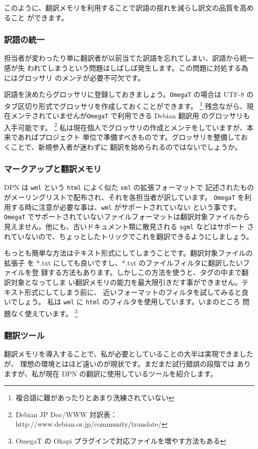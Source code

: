 \documentclass[mingoth,a4paper]{jsarticle}
\begin{document}
このように、翻訳メモリを利用することで訳語の揺れを減らし訳文の品質を高めること
ができます。

\subsubsection{訳語の統一}

担当者が変わったり単に翻訳者が以前当てた訳語を忘れてしまい、訳語から統一感が失
われてしまうという問題はしばしば発生します。この問題に対処する為にはグロッサリ
のメンテが必要不可欠です。

訳語を決めたらグロッサリに登録しておきましょう。{\tt OmegaT} の場合は UTF-8 の
タブ区切り形式でグロッサリを作成しておくことができます。
\footnote{複合語に難があったりとあまり洗練されていない}
残念ながら、現在メンテされていませんが{\tt OmegaT} で利用できる Debian 翻訳用
のグロッサリも入手可能です。
\footnote{Debian JP Doc/WWW 対訳表：http://www.debian.or.jp/community/translate/}
私は現在個人でグロッサリの作成とメンテをしていますが、本来であればプロジェクト
単位で準備すべきものです。グロッサリを整備しておくことで、新規参入者が迷わずに
翻訳を始められるのではないでしょうか。

\subsubsection{マークアップと翻訳メモリ}
DPN は {\tt wml} という {\tt html} によく似た {\tt xml} の拡張フォーマットで
記述されたものがメーリングリストで配布され、それを各担当者が訳しています。
{\tt OmegaT} を利用する時に注意が必要な事は、{\tt wml} がサポートされていない
という事です。
{\tt OmegaT} でサポートされていないファイルフォーマットは翻訳対象ファイルから
見えません。他にも、古いドキュメント類に散見される {\tt sgml} などはサポート
されていないので、ちょっとしたトリックでこれを翻訳できるようにしましょう。

もっとも簡単な方法はテキスト形式にしてしまうことです。翻訳対象ファイルの拡張子
を *.txt にしても良いですし、*.txt のファイルフィルタに翻訳したいファイルを登
録する方法もあります。しかしこの方法を使うと、タグの中まで翻訳対象となってしま
い翻訳メモリの能力を最大限引きだす事ができません。テキスト形式にしてしまう前に、
近いフォーマットのフィルタを試してみると良いでしょう。
私は {\tt wml} に {\tt html} のフィルタを使用しています。いまのところ
問題なく使えています。
\footnote{OmegaT の Okapi プラグインで対応ファイルを増やす方法もある}

\subsubsection{翻訳ツール}
翻訳メモリを導入することで、私が必要としていることの大半は実現できましたが、
理想の環境とはほど遠いのが現状です。まだまだ試行錯誤の段階では
ありますが、私が現在 DPN の翻訳に使用しているツールを紹介します。
\end{document}
